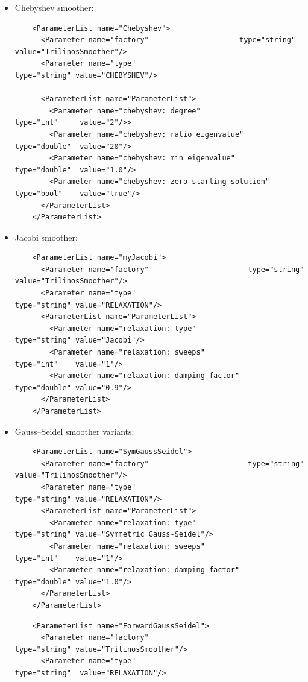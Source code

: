 \documentclass[10pt,fleqn]{book}
\begin{document}
\begin{itemize}

\item Chebyshev smoother:
\begin{lstlisting}
    <ParameterList name="Chebyshev">
      <Parameter name="factory"                     type="string" value="TrilinosSmoother"/>
      <Parameter name="type"                               type="string" value="CHEBYSHEV"/>

      <ParameterList name="ParameterList">
        <Parameter name="chebyshev: degree"                 type="int"     value="2"/>>
        <Parameter name="chebyshev: ratio eigenvalue"       type="double"  value="20"/>
        <Parameter name="chebyshev: min eigenvalue"         type="double"  value="1.0"/>
        <Parameter name="chebyshev: zero starting solution" type="bool"    value="true"/>
      </ParameterList>
    </ParameterList>
\end{lstlisting}
\item Jacobi smoother:
\begin{lstlisting}
    <ParameterList name="myJacobi">
      <Parameter name="factory"                       type="string" value="TrilinosSmoother"/>
      <Parameter name="type"                                type="string" value="RELAXATION"/>
      <ParameterList name="ParameterList">
        <Parameter name="relaxation: type"                  type="string" value="Jacobi"/>
        <Parameter name="relaxation: sweeps"                type="int"    value="1"/>
        <Parameter name="relaxation: damping factor"        type="double" value="0.9"/>
      </ParameterList>
    </ParameterList>
\end{lstlisting}
\item Gauss--Seidel smoother variants:
\begin{lstlisting}
    <ParameterList name="SymGaussSeidel">
      <Parameter name="factory"                       type="string" value="TrilinosSmoother"/>
      <Parameter name="type"                                type="string" value="RELAXATION"/>
      <ParameterList name="ParameterList">
        <Parameter name="relaxation: type"                  type="string" value="Symmetric Gauss-Seidel"/>
        <Parameter name="relaxation: sweeps"                type="int"    value="1"/>
        <Parameter name="relaxation: damping factor"        type="double" value="1.0"/>
      </ParameterList>
    </ParameterList>
\end{lstlisting}

\begin{lstlisting}
    <ParameterList name="ForwardGaussSeidel">
      <Parameter name="factory"                        type="string" value="TrilinosSmoother"/>
      <Parameter name="type"                                type="string"  value="RELAXATION"/>


\end{lstlisting}
\end{itemize}
\end{document}

